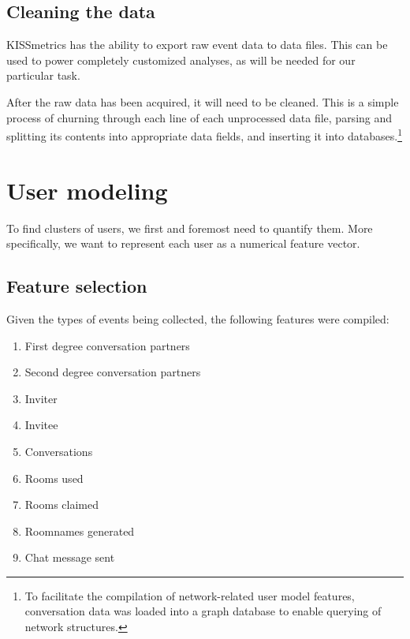 \subsection{Cleaning the data}
\label{approach:sec:cleaning_data}

KISSmetrics has the ability to export raw event data to data files. This can be used to power completely customized analyses, as will be needed for our particular task.

After the raw data has been acquired, it will need to be cleaned. This is a simple process of churning through each line of each unprocessed data file, parsing and splitting its contents into appropriate data fields, and inserting it into databases.\footnote{To facilitate the compilation of network-related user model features, conversation data was loaded into a graph database to enable querying of network structures.}


\section{User modeling} %
\label{approach:sec:user_modeling}

To find clusters of users, we first and foremost need to quantify them. More specifically, we want to represent each user as a numerical feature vector.

\subsection{Feature selection}
\label{approach:sec:feature_selection}

Given the types of events being collected, the following features were compiled:

\begin{enumerate}
  \item First degree conversation partners
  \item Second degree conversation partners
  \item Inviter
  \item Invitee
  \item Conversations
  \item Rooms used
  \item Rooms claimed
  \item Roomnames generated
  \item Chat message sent
\end{enumerate}

